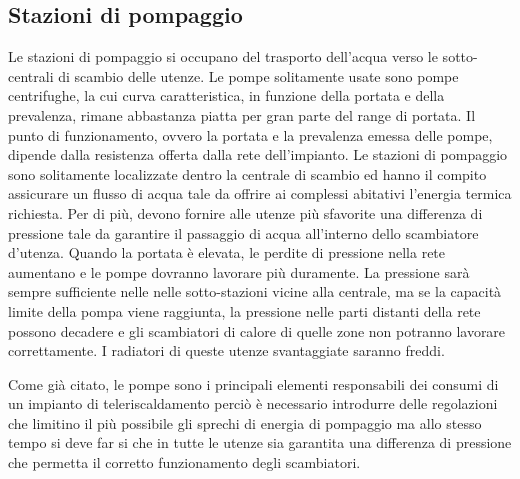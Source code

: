 \documentclass[laurea,oneside,11pt]{USiena_tesiLM}
\begin{document}
\subsection{Stazioni di pompaggio}
Le stazioni di pompaggio si occupano del trasporto dell'acqua verso le sotto-centrali di scambio delle utenze. Le pompe solitamente usate sono pompe centrifughe, la cui curva caratteristica, in funzione della portata e della prevalenza, rimane abbastanza piatta per gran parte del range di portata. 
Il punto di funzionamento, ovvero la portata e la prevalenza emessa delle pompe, dipende dalla resistenza offerta dalla rete dell'impianto. 
Le stazioni di pompaggio sono solitamente localizzate dentro la centrale di scambio ed hanno il compito assicurare un flusso di acqua tale da offrire ai complessi abitativi l'energia termica richiesta. Per di più, devono fornire alle utenze più sfavorite una differenza di pressione tale da garantire il passaggio di acqua all'interno dello scambiatore d'utenza. 
Quando la portata è elevata, le perdite di pressione nella rete aumentano e le pompe dovranno lavorare più duramente. La pressione sarà sempre sufficiente nelle nelle sotto-stazioni vicine alla centrale, ma se la capacità limite della pompa viene raggiunta, la pressione nelle parti distanti della rete  possono decadere e gli scambiatori di calore di quelle zone non potranno lavorare correttamente. I radiatori di queste utenze svantaggiate saranno freddi.

Come già citato, le pompe sono i principali elementi responsabili dei consumi di un impianto di teleriscaldamento perciò è necessario introdurre delle regolazioni che limitino il più possibile gli sprechi di energia di pompaggio ma allo stesso tempo si deve far si che in tutte le utenze sia garantita una differenza di pressione che permetta il corretto funzionamento degli scambiatori. 
\end{document}
